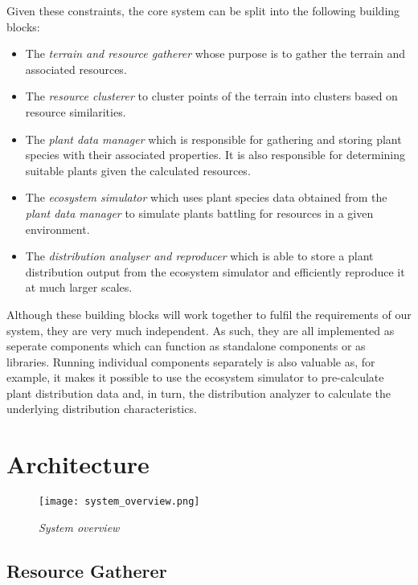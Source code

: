 Given these constraints, the core system can be split into the following building blocks:
\begin{itemize}
\item The \textit{terrain and resource gatherer} whose purpose is to gather the terrain and associated resources.
\item The \textit{resource clusterer} to cluster points of the terrain into clusters based on resource similarities.
\item The \textit{plant data manager} which is responsible for gathering and storing plant species with their associated properties. It is also responsible for determining suitable plants given the calculated resources.
\item The \textit{ecosystem simulator} which uses plant species data obtained from the \textit{plant data manager} to simulate plants battling for resources in a given environment.
\item The \textit{distribution analyser and reproducer} which is able to store a plant distribution output from the ecosystem simulator and efficiently reproduce it at much larger scales.
\end{itemize}

Although these building blocks will work together to fulfil the requirements of our system, they are very much independent. As such, they are all implemented as seperate components which can function as standalone components or as libraries. Running individual components separately is also valuable as, for example, it makes it possible to use the ecosystem simulator to pre-calculate plant distribution data and, in turn, the distribution analyzer to calculate the underlying distribution characteristics.\\

\section{Architecture} 

\begin{figure}
\center
	\texttt{[image: system\_overview.png]}
	\caption{\textit{System overview}}	
	\label{fig:system_overview}
\end{figure}

\subsection{Resource Gatherer} \label{sec:resource_gatherer}

